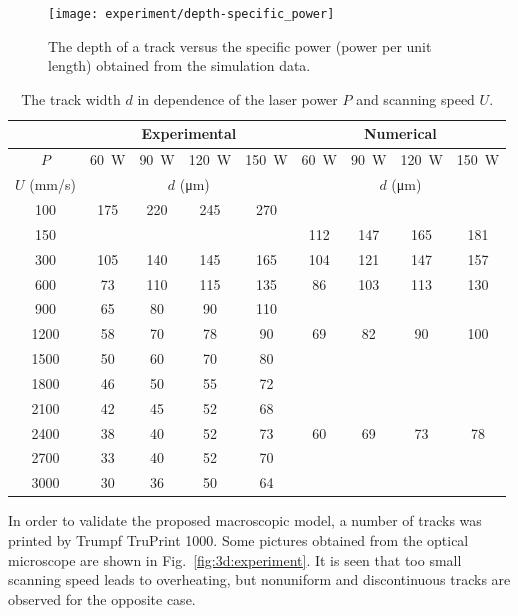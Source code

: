 \documentclass{article}
\begin{document}
\begin{figure}
    \centering
    \texttt{[image: experiment/depth-specific\_power]}
    \caption{
        The depth of a track versus the specific power (power per unit length) obtained from the simulation data.
    }\label{fig:3d:depth}
\end{figure}

\begin{table}
    \centering
    \caption{
        The track width \(d\) in dependence of the laser power \(P\) and scanning speed \(U\).
    }\label{table:3d:width}
    \centering
    \begin{tabular}{|c|cccc|cccc|}\hline
        & \multicolumn{4}{c|}{Experimental} & \multicolumn{4}{c|}{Numerical} \\\hline
        \(P\) & \SI{60}{W} & \SI{90}{W} & \SI{120}{W} & \SI{150}{W} & \SI{60}{W} & \SI{90}{W} & \SI{120}{W} & \SI{150}{W} \\\hline
        \(U\) (\si{mm/s}) & \multicolumn{4}{c|}{\(d\) (\si{\um})} & \multicolumn{4}{c|}{\(d\) (\si{\um})} \\\hline
        100  & 175 & 220 & 245 & 270 &     &     &     &     \\
        150  &     &     &     &     & 112 & 147 & 165 & 181 \\
        300  & 105 & 140 & 145 & 165 & 104 & 121 & 147 & 157 \\
        600  & 73  & 110 & 115 & 135 & 86  & 103 & 113 & 130 \\
        900  & 65  & 80  & 90  & 110 &     &     &     &     \\
        1200 & 58  & 70  & 78  & 90  & 69  & 82  & 90  & 100 \\
        1500 & 50  & 60  & 70  & 80  &     &     &     &     \\
        1800 & 46  & 50  & 55  & 72  &     &     &     &     \\
        2100 & 42  & 45  & 52  & 68  &     &     &     &     \\
        2400 & 38  & 40  & 52  & 73  & 60  & 69  & 73  & 78  \\
        2700 & 33  & 40  & 52  & 70  &     &     &     &     \\
        3000 & 30  & 36  & 50  & 64  &     &     &     &     \\\hline
    \end{tabular}
\end{table}

In order to validate the proposed macroscopic model, a number of tracks was printed by Trumpf TruPrint 1000.
Some pictures obtained from the optical microscope are shown in Fig.~\ref{fig:3d:experiment}.
It is seen that too small scanning speed leads to overheating,
but nonuniform and discontinuous tracks are observed for the opposite case.
\end{document}
